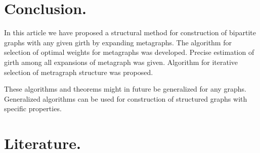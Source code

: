 \documentclass[a4paper,fleqn]{cas-sc}
\begin{document}
\section{Conclusion.}


In this article we have proposed a structural method for construction of bipartite graphs with any given girth by expanding metagraphs. The algorithm for selection of optimal weights for metagraphs was developed. Precise estimation of girth among all expansions of metagraph was given. Algorithm for iterative selection of metragraph structure was proposed.

These algorithms and theorems might in future be generalized for any graphs. Generalized algorithms can be used for construction of structured graphs with specific properties.

\section{Literature.}

\end{document}
